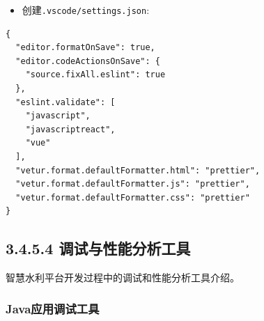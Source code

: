 \begin{enumerate}
  \begin{itemize}
  \tightlist
  \item
    创建\passthrough{\lstinline!.vscode/settings.json!}:
  \end{itemize}

\begin{lstlisting}
{
  "editor.formatOnSave": true,
  "editor.codeActionsOnSave": {
    "source.fixAll.eslint": true
  },
  "eslint.validate": [
    "javascript",
    "javascriptreact",
    "vue"
  ],
  "vetur.format.defaultFormatter.html": "prettier",
  "vetur.format.defaultFormatter.js": "prettier",
  "vetur.format.defaultFormatter.css": "prettier"
}
\end{lstlisting}
\end{enumerate}

\subsection{3.4.5.4
调试与性能分析工具}\label{ux8c03ux8bd5ux4e0eux6027ux80fdux5206ux6790ux5de5ux5177}

智慧水利平台开发过程中的调试和性能分析工具介绍。

\subsubsection{Java应用调试工具}\label{javaux5e94ux7528ux8c03ux8bd5ux5de5ux5177}

